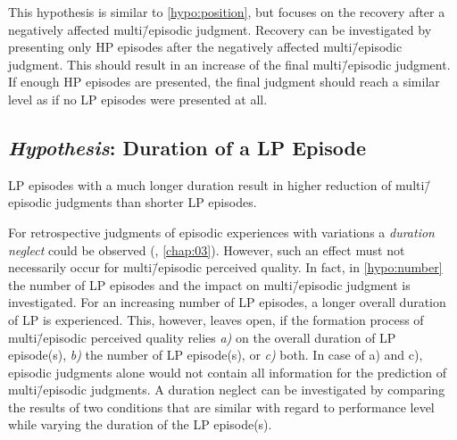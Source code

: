 This hypothesis is similar to \autoref{hypo:position}, but focuses on the recovery after a negatively affected multi\=/episodic judgment.
Recovery can be investigated by presenting only \ac{HP} episodes after the negatively affected multi\=/episodic judgment.
This should result in an increase of the final multi\=/episodic judgment.
If enough \ac{HP} episodes are presented, the final judgment should reach a similar level as if no \ac{LP} episodes were presented at all.

\subsection[H6: Duration of a \acs{LP} Episode]{\emph{Hypothesis}: Duration of a \acs{LP} Episode}
\begin{hypothesis}\label{hypo:duration}
\ac{LP} episodes with a much longer duration result in higher reduction of multi\=/episodic judgments than shorter \ac{LP} episodes.
\end{hypothesis}

For retrospective judgments of episodic experiences with variations a \emph{duration neglect} could be observed (\cf, \autoref{chap:03}).
However, such an effect must not necessarily occur for multi\=/episodic perceived quality.
In fact, in \autoref{hypo:number} the number of \ac{LP} episodes and the impact on multi\=/episodic judgment is investigated.
For an increasing number of \ac{LP} episodes, a longer overall duration of \ac{LP} is experienced.
This, however, leaves open, if the formation process of multi\=/episodic perceived quality relies \emph{a)} on the overall duration of \ac{LP} episode(s), \emph{b)} the number of \ac{LP} episode(s), or \emph{c)} both.
In case of a) and c), episodic judgments alone would not contain all information for the prediction of multi\=/episodic judgments.
A duration neglect can be investigated by comparing the results of two conditions that are similar with regard to performance level while varying the duration of the \ac{LP} episode(s).

